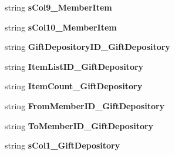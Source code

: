 \begin{DoxyCompactItemize}
\item 
string {\bfseries s\+Col9\+\_\+\+Member\+Item}\hypertarget{a00116_ae7adc9e635b6da317a358dad2c6f7d8e}{}\label{a00116_ae7adc9e635b6da317a358dad2c6f7d8e}

\item 
string {\bfseries s\+Col10\+\_\+\+Member\+Item}\hypertarget{a00116_ac9cc56cb5063b846b5522aa3a09c4508}{}\label{a00116_ac9cc56cb5063b846b5522aa3a09c4508}

\item 
string {\bfseries Gift\+Depository\+I\+D\+\_\+\+Gift\+Depository}\hypertarget{a00116_a8d2b58e61b80aeeb41d1d59998c435ca}{}\label{a00116_a8d2b58e61b80aeeb41d1d59998c435ca}

\item 
string {\bfseries Item\+List\+I\+D\+\_\+\+Gift\+Depository}\hypertarget{a00116_ab0ce0c6663df983bd484c4ed9a576346}{}\label{a00116_ab0ce0c6663df983bd484c4ed9a576346}

\item 
string {\bfseries Item\+Count\+\_\+\+Gift\+Depository}\hypertarget{a00116_a9ed6940916483491d7d6a247e2c0946b}{}\label{a00116_a9ed6940916483491d7d6a247e2c0946b}

\item 
string {\bfseries From\+Member\+I\+D\+\_\+\+Gift\+Depository}\hypertarget{a00116_a3147ae8c258a18c9106f878b3c155493}{}\label{a00116_a3147ae8c258a18c9106f878b3c155493}

\item 
string {\bfseries To\+Member\+I\+D\+\_\+\+Gift\+Depository}\hypertarget{a00116_a7f93f2bfa83a4d68ba3ef9bceac6a821}{}\label{a00116_a7f93f2bfa83a4d68ba3ef9bceac6a821}

\item 
string {\bfseries s\+Col1\+\_\+\+Gift\+Depository}\hypertarget{a00116_a5421b972e4bca2927eed4476d58677d4}{}\label{a00116_a5421b972e4bca2927eed4476d58677d4}


\end{DoxyCompactItemize}
